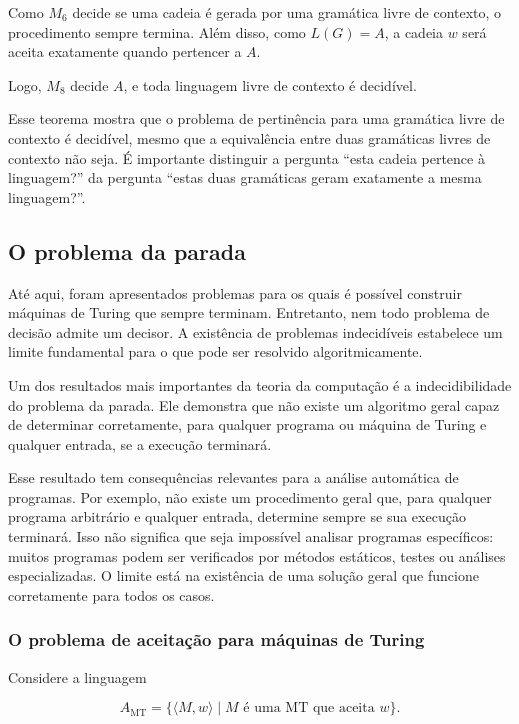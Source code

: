 \documentclass[
  brazilian,
  letterpaper,
]{book}
\theoremstyle{plain}
\theoremstyle{definition}
\theoremstyle{remark}
\begin{document}
Como \(M_6\) decide se uma cadeia é gerada por uma gramática livre de
contexto, o procedimento sempre termina. Além disso, como \(L(G)=A\), a
cadeia \(w\) será aceita exatamente quando pertencer a \(A\).

Logo, \(M_8\) decide \(A\), e toda linguagem livre de contexto é
decidível.

Esse teorema mostra que o problema de pertinência para uma gramática
livre de contexto é decidível, mesmo que a equivalência entre duas
gramáticas livres de contexto não seja. É importante distinguir a
pergunta ``esta cadeia pertence à linguagem?'' da pergunta ``estas duas
gramáticas geram exatamente a mesma linguagem?''.

\subsection{O problema da parada}\label{o-problema-da-parada}

Até aqui, foram apresentados problemas para os quais é possível
construir máquinas de Turing que sempre terminam. Entretanto, nem todo
problema de decisão admite um decisor. A existência de problemas
indecidíveis estabelece um limite fundamental para o que pode ser
resolvido algoritmicamente.

Um dos resultados mais importantes da teoria da computação é a
indecidibilidade do problema da parada. Ele demonstra que não existe um
algoritmo geral capaz de determinar corretamente, para qualquer programa
ou máquina de Turing e qualquer entrada, se a execução terminará.

Esse resultado tem consequências relevantes para a análise automática de
programas. Por exemplo, não existe um procedimento geral que, para
qualquer programa arbitrário e qualquer entrada, determine sempre se sua
execução terminará. Isso não significa que seja impossível analisar
programas específicos: muitos programas podem ser verificados por
métodos estáticos, testes ou análises especializadas. O limite está na
existência de uma solução geral que funcione corretamente para todos os
casos.

\subsubsection{O problema de aceitação para máquinas de
Turing}\label{o-problema-de-aceitauxe7uxe3o-para-muxe1quinas-de-turing}

Considere a linguagem

\[
A_{\mathrm{MT}}=\{\langle M,w\rangle\mid M\text{ é uma MT que aceita }w\}.
\]
\end{document}
